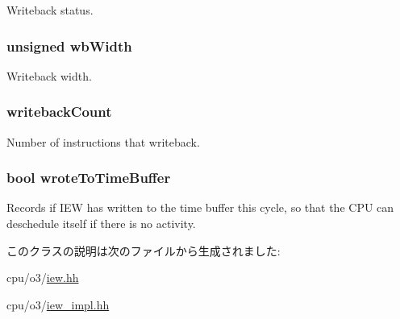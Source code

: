 \label{classDefaultIEW_abc3a4c25708a2663da1d26bf7fc045a0}
Writeback status. \hypertarget{classDefaultIEW_a97c827109db73fbbd67c50a90eccf7ac}{
\subsubsection[{wbWidth}]{\setlength{\rightskip}{0pt plus 5cm}unsigned {\bf wbWidth}}}
\label{classDefaultIEW_a97c827109db73fbbd67c50a90eccf7ac}
Writeback width. \hypertarget{classDefaultIEW_a85f5041a2e3375a2dc81bc0ae534aa2e}{
\subsubsection[{writebackCount}]{ {\bf writebackCount}}}
\label{classDefaultIEW_a85f5041a2e3375a2dc81bc0ae534aa2e}
Number of instructions that writeback. \hypertarget{classDefaultIEW_a2c7e870d4babdac0dc91fc7ffabd0f3d}{
\subsubsection[{wroteToTimeBuffer}]{\setlength{\rightskip}{0pt plus 5cm}bool {\bf wroteToTimeBuffer}}}
\label{classDefaultIEW_a2c7e870d4babdac0dc91fc7ffabd0f3d}
Records if IEW has written to the time buffer this cycle, so that the CPU can deschedule itself if there is no activity. 

このクラスの説明は次のファイルから生成されました:\begin{DoxyCompactItemize}
\item 
cpu/o3/\hyperlink{iew_8hh}{iew.hh}\item 
cpu/o3/\hyperlink{iew__impl_8hh}{iew\_\-impl.hh}\end{DoxyCompactItemize}
